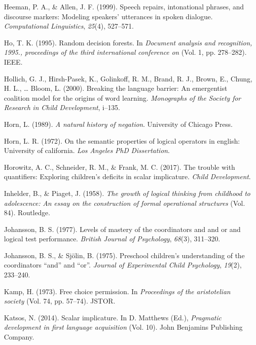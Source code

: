 \documentclass[oneside]{report}
\theoremstyle{definition}
\theoremstyle{definition}
\theoremstyle{definition}
\theoremstyle{remark}
\begin{document}
\hypertarget{ref-heeman1999speech}{}
Heeman, P. A., \& Allen, J. F. (1999). Speech repairs, intonational
phrases, and discourse markers: Modeling speakers' utterances in spoken
dialogue. \emph{Computational Linguistics}, \emph{25}(4), 527--571.

\hypertarget{ref-ho1995random}{}
Ho, T. K. (1995). Random decision forests. In \emph{Document analysis
and recognition, 1995., proceedings of the third international
conference on} (Vol. 1, pp. 278--282). IEEE.

\hypertarget{ref-hollich2000breaking}{}
Hollich, G. J., Hirsh-Pasek, K., Golinkoff, R. M., Brand, R. J., Brown,
E., Chung, H. L., \ldots{} Bloom, L. (2000). Breaking the language
barrier: An emergentist coalition model for the origins of word
learning. \emph{Monographs of the Society for Research in Child
Development}, i--135.

\hypertarget{ref-horn1989natural}{}
Horn, L. (1989). \emph{A natural history of negation}. University of
Chicago Press.

\hypertarget{ref-horn1972semantic}{}
Horn, L. R. (1972). On the semantic properties of logical operators in
english: University of california. \emph{Los Angeles PhD Dissertation}.

\hypertarget{ref-horowitz2017trouble}{}
Horowitz, A. C., Schneider, R. M., \& Frank, M. C. (2017). The trouble
with quantifiers: Exploring children's deficits in scalar implicature.
\emph{Child Development}.

\hypertarget{ref-piaget1958growth}{}
Inhelder, B., \& Piaget, J. (1958). \emph{The growth of logical thinking
from childhood to adolescence: An essay on the construction of formal
operational structures} (Vol. 84). Routledge.

\hypertarget{ref-johansson1977levels}{}
Johansson, B. S. (1977). Levels of mastery of the coordinators and and
or and logical test performance. \emph{British Journal of Psychology},
\emph{68}(3), 311--320.

\hypertarget{ref-johansson1975preschool}{}
Johansson, B. S., \& Sjölin, B. (1975). Preschool children's
understanding of the coordinators ``and'' and ``or''. \emph{Journal of
Experimental Child Psychology}, \emph{19}(2), 233--240.

\hypertarget{ref-kamp1973free}{}
Kamp, H. (1973). Free choice permission. In \emph{Proceedings of the
aristotelian society} (Vol. 74, pp. 57--74). JSTOR.

\hypertarget{ref-katsos2014scalar}{}
Katsos, N. (2014). Scalar implicature. In D. Matthews (Ed.),
\emph{Pragmatic development in first language acquisition} (Vol. 10).
John Benjamins Publishing Company.
\end{document}

